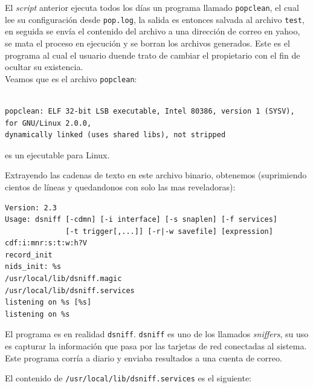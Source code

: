 \vspace{1em}
 
El \textit{script} anterior ejecuta todos los días un programa llamado
\texttt{popclean}, el cual lee su configuración desde \texttt{pop.log}, la salida es entonces
salvada al archivo \texttt{test}, en seguida se envía el contenido del archivo
a una dirección de correo en yahoo, se mata el proceso en ejecución y
se borran los archivos generados. Este es el programa al cual el
usuario duende trato de cambiar el propietario con el fin de ocultar
su existencia.\\


 Veamos que es el archivo \texttt{popclean}:
 
\vspace{1em}

\begin{lstlisting}[style=terminal] 
  
popclean: ELF 32-bit LSB executable, Intel 80386, version 1 (SYSV), for GNU/Linux 2.0.0, 
dynamically linked (uses shared libs), not stripped

\end{lstlisting}

\vspace{1em}

 es un ejecutable para Linux.

Extrayendo las cadenas de texto en este archivo binario, obtenemos
(suprimiendo cientos de líneas y quedandonos con solo las mas
reveladoras):

\vspace{1em}

\begin{lstlisting}[style=terminal]
Version: 2.3
Usage: dsniff [-cdmn] [-i interface] [-s snaplen] [-f services]
              [-t trigger[,...]] [-r|-w savefile] [expression]
cdf:i:mnr:s:t:w:h?V
record_init
nids_init: %s
/usr/local/lib/dsniff.magic
/usr/local/lib/dsniff.services
listening on %s [%s]
listening on %s
\end{lstlisting}

\vspace{1em}

El programa es en realidad \texttt{dsniff}. \texttt{dsniff} es uno de los llamados
\textit{sniffers}, su uso es capturar la información que pasa por las
tarjetas de red conectadas al sistema. Este programa corría a diario y enviaba resultados a
una cuenta de correo.


 El contenido de \texttt{/usr/local/lib/dsniff.services} es el siguiente:
 
